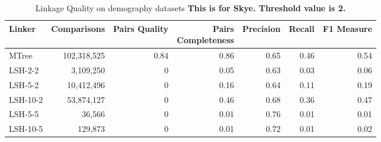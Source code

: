 \documentclass{llncs}
\begin{document}
\begin{table}[ht]
\centering
\begin{tabular}{l|r|r|r|r|r|r}
\parbox{0.18\linewidth}{\centering Linker} &
\parbox{0.16\linewidth}{\centering Comparisons} &
\parbox{0.11\linewidth}{\centering Pairs Quality} &
\parbox{0.17\linewidth}{\centering Pairs \\ Completeness} &
\parbox{0.11\linewidth}{\centering Precision} &
\parbox{0.08\linewidth}{\centering Recall} &
\parbox{0.11\linewidth}{\centering F1 Measure} \\ \hline \hline
MTree    & 102,318,525         & 0.84                  & 0.86                       & 0.65      & 0.46   & 0.54      \\ \hline
LSH-2-2  & 3,109,250           & 0                     & 0.05                       & 0.63      & 0.03   & 0.06       \\
LSH-5-2  & 10,412,496          & 0                     & 0.16                       & 0.64      & 0.11   & 0.19       \\
LSH-10-2 & 53,874,127          & 0                     & 0.46                       & 0.68      & 0.36   & 0.47       \\
LSH-5-5  & 36,566             & 0                     & 0.01                       & 0.76      & 0.01   & 0.01       \\
LSH-10-5 & 129,873            & 0                     & 0.01                       & 0.72      & 0.01   & 0.02       \\ \hline
\end{tabular}
\caption{Linkage Quality on demography datasets \textbf{This is for Skye. Threshold value is 2.}
\label{comparison-of-results-demography-skye}
}
\end{table}
\end{document}
